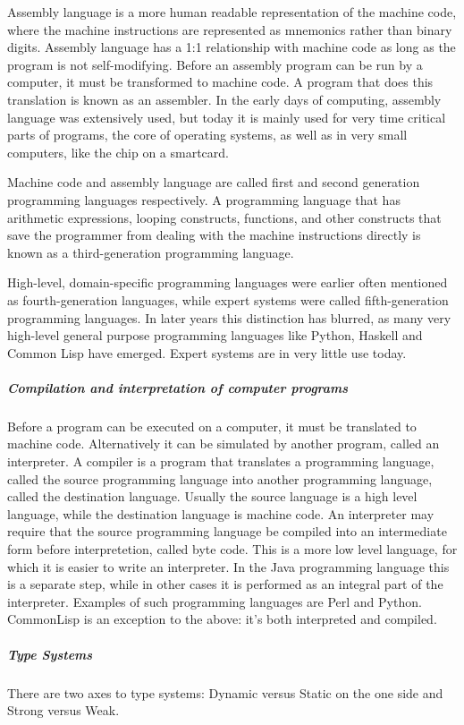 Assembly language is a more human readable representation of the machine code, where the machine instructions are represented as mnemonics rather than binary digits. Assembly language has a 1:1 relationship with machine code as long as the program is not self-modifying. Before an assembly program can be run by a computer, it must be transformed to machine code. A program that does this translation is known as an assembler. In the early days of computing, assembly language was extensively used, but today it is mainly used for very time critical parts of programs, the core of operating systems, as well as in very small computers, like the chip on a smartcard.

Machine code and assembly language are called first and second generation programming languages respectively. A programming language that has arithmetic expressions, looping constructs, functions, and other constructs that save the programmer from dealing with the machine instructions directly is known as a third-generation programming language.

High-level, domain-specific programming languages were earlier often mentioned as fourth-generation languages, while expert systems were called fifth-generation programming languages. In later years this distinction has blurred, as many very high-level general purpose programming languages like Python, Haskell and Common Lisp have emerged. Expert systems are in very little use today.

\subparagraph*{Compilation and interpretation of computer programs}
\hfill \break
Before a program can be executed on a computer, it must be translated to machine code. Alternatively it can be simulated by another program, called an interpreter. A compiler is a program that translates a programming language, called the source programming language into another programming language, called the destination language. Usually the source language is a high level language, while the destination language is machine code. An interpreter may require that the source programming language be compiled into an intermediate form before interpretetion, called byte code. This is a more low level language, for which it is easier to write an interpreter. In the Java programming language this is a separate step, while in other cases it is performed as an integral part of the interpreter. Examples of such programming languages are Perl and Python. CommonLisp is an exception to the above: it's both interpreted and compiled.

\subparagraph*{Type Systems}
\hfill \break
There are two axes to type systems: Dynamic versus Static on the one side and Strong versus Weak.

